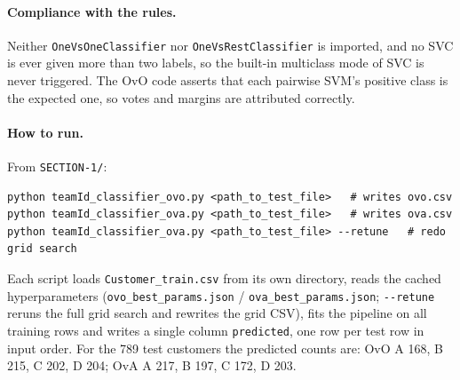\documentclass[11pt]{article}
\begin{document}
\paragraph{Compliance with the rules.} Neither \texttt{OneVsOneClassifier} nor
\texttt{OneVsRestClassifier} is imported, and no SVC is ever given more than two labels, so the
built-in multiclass mode of SVC is never triggered. The OvO code asserts that each pairwise SVM's
positive class is the expected one, so votes and margins are attributed correctly.

\paragraph{How to run.} From \texttt{SECTION-1/}:
\begin{lstlisting}
python teamId_classifier_ovo.py <path_to_test_file>   # writes ovo.csv
python teamId_classifier_ova.py <path_to_test_file>   # writes ova.csv
python teamId_classifier_ova.py <path_to_test_file> --retune   # redo grid search
\end{lstlisting}
Each script loads \texttt{Customer\_train.csv} from its own directory, reads the cached
hyperparameters (\texttt{ovo\_best\_params.json} / \texttt{ova\_best\_params.json}; \texttt{-{}-retune}
reruns the full grid search and rewrites the grid CSV), fits the pipeline on all training rows and
writes a single column \texttt{predicted}, one row per test row in input order. For the 789 test
customers the predicted counts are: OvO A 168, B 215, C 202, D 204; OvA A 217, B 197, C 172, D 203.
\end{document}
